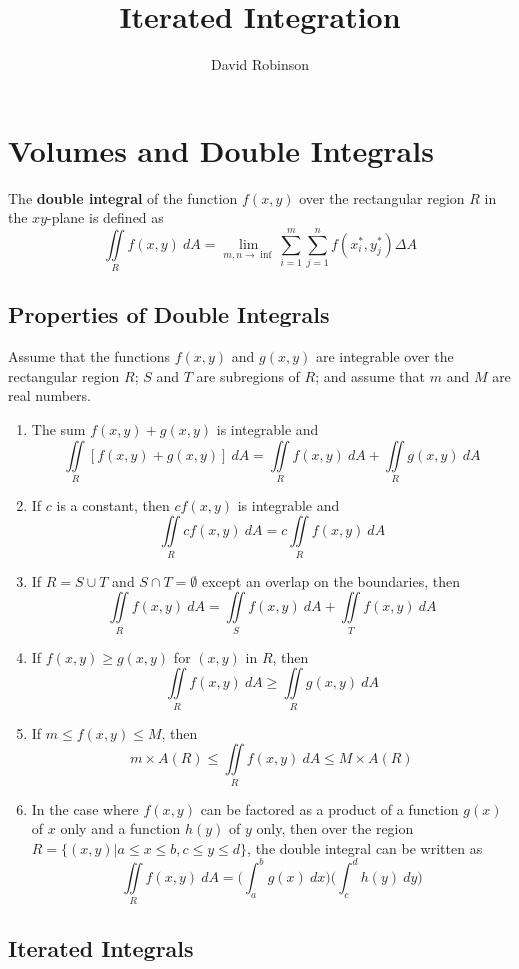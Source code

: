 \documentclass{article}
\title{Iterated Integration}
\author{David Robinson}
\date{}
\begin{document}
\maketitle

\section*{Volumes and Double Integrals}

The \textbf{double integral} of the function $f(x,y)$ over the rectangular region $R$ in the $xy$-plane is defined as
\[\iint\limits_R f(x,y)\: dA=\lim_{m,n\rightarrow\inf}\sum_{i=1}^m\sum_{j=1}^n f(x_i^*,y_j^*)\Delta A\]

\subsection*{Properties of Double Integrals}
Assume that the functions $f(x,y)$ and $g(x,y)$ are integrable over the rectangular region $R$; $S$ and $T$ are subregions of $R$; and assume that $m$ and $M$ are real numbers.
\begin{enumerate}
    \item The sum $f(x,y)+g(x,y)$ is integrable and
    \[\iint\limits_R [f(x,y)+g(x,y)]\: dA=\iint\limits_R f(x,y)\: dA + \iint\limits_R g(x,y)\: dA\]
    \item If $c$ is a constant, then $cf(x,y)$ is integrable and
    \[\iint\limits_R cf(x,y)\: dA=c\iint\limits_R f(x,y)\: dA\]
    \item If $R=S\cup T$ and $S\cap T=\emptyset$ except an overlap on the boundaries, then
    \[\iint\limits_R f(x,y)\: dA=\iint\limits_S f(x,y)\: dA+\iint\limits_T f(x,y)\: dA\]
    \item If $f(x,y)\geq g(x,y)$ for $(x,y)$ in $R$, then
    \[\iint\limits_R f(x,y)\: dA\geq \iint\limits_R g(x,y)\: dA\]
    \item If $m\leq f(x,y)\leq M$, then
    \[m\times A(R)\leq \iint\limits_R f(x,y)\: dA\leq M\times A(R)\]
    \item In the case where $f(x,y)$ can be factored as a product of a function $g(x)$ of $x$ only and a function $h(y)$ of $y$ only, then over the region $R=\{(x,y)|a\leq x\leq b, c\leq y\leq d\}$, the double integral can be written as
    \[\iint\limits_R f(x,y)\: dA=\Bigg(\int_a^b g(x)\: dx\Bigg)\Bigg(\int_c^d h(y)\: dy\Bigg)\]
\end{enumerate}

\pagebreak

\subsection*{Iterated Integrals}
\end{document}
